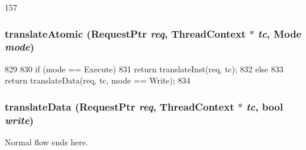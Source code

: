 \begin{DoxyCode}
157 {}
\end{DoxyCode}
\hypertarget{classSparcISA_1_1TLB_ad54e01e3c0a1613098a76b7f92e5be93}{
\subsubsection[{translateAtomic}]{ translateAtomic ({\bf RequestPtr} {\em req}, \/  {\bf ThreadContext} $\ast$ {\em tc}, \/  {\bf Mode} {\em mode})}}
\label{classSparcISA_1_1TLB_ad54e01e3c0a1613098a76b7f92e5be93}



\begin{DoxyCode}
829 {
830     if (mode == Execute)
831         return translateInst(req, tc);
832     else
833         return translateData(req, tc, mode == Write);
834 }
\end{DoxyCode}
\hypertarget{classSparcISA_1_1TLB_ad54aef66412f77e2a15a621a126dfb52}{
\subsubsection[{translateData}]{ translateData ({\bf RequestPtr} {\em req}, \/  {\bf ThreadContext} $\ast$ {\em tc}, \/  bool {\em write})}}
\label{classSparcISA_1_1TLB_ad54aef66412f77e2a15a621a126dfb52}


Normal flow ends here. 


